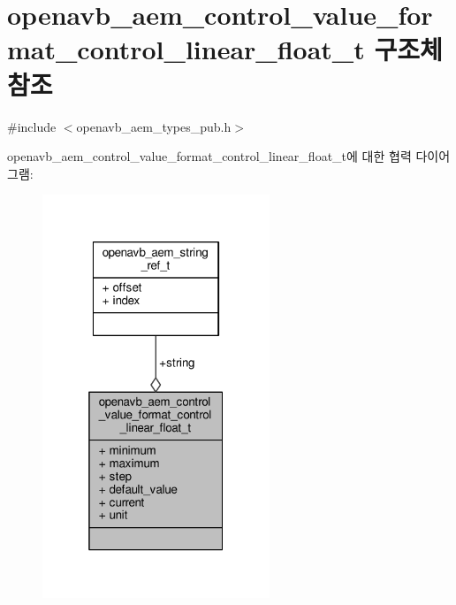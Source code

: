\hypertarget{structopenavb__aem__control__value__format__control__linear__float__t}{}\section{openavb\+\_\+aem\+\_\+control\+\_\+value\+\_\+format\+\_\+control\+\_\+linear\+\_\+float\+\_\+t 구조체 참조}
\label{structopenavb__aem__control__value__format__control__linear__float__t}


{\ttfamily \#include $<$openavb\+\_\+aem\+\_\+types\+\_\+pub.\+h$>$}



openavb\+\_\+aem\+\_\+control\+\_\+value\+\_\+format\+\_\+control\+\_\+linear\+\_\+float\+\_\+t에 대한 협력 다이어그램\+:
\nopagebreak
\begin{figure}[H]
\begin{center}
\leavevmode
\includegraphics[width=193pt]{structopenavb__aem__control__value__format__control__linear__float__t__coll__graph}
\end{center}
\end{figure}
